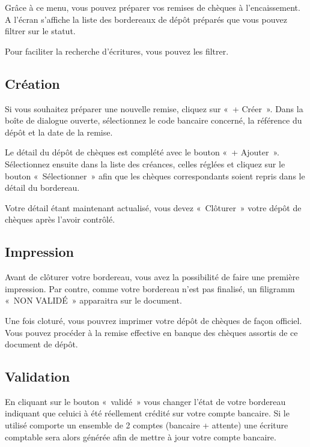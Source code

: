 \documentclass[a4paper,10pt,oneside,french]{sphinxmanual}
\begin{document}
\sphinxAtStartPar
Grâce à ce menu, vous pouvez préparer vos remises de chèques à l’encaissement.
A l’écran s’affiche la liste des bordereaux de dépôt préparés que vous pouvez filtrer sur le statut.
\begin{quote}

\noindent{}
\end{quote}

\sphinxAtStartPar
Pour faciliter la recherche d’écritures, vous pouvez les filtrer.


\subsection{Création}
\label{\detokenize{payoff/deposit:creation}}
\sphinxAtStartPar
Si vous souhaitez préparer une nouvelle remise, cliquez sur « + Créer ».
Dans la boîte de dialogue ouverte, sélectionnez le code bancaire concerné, la référence du dépôt et la date de la remise.

\sphinxAtStartPar
Le détail du dépôt de chèques est complété avec le bouton « + Ajouter ».
Sélectionnez ensuite dans la liste des créances, celles réglées et cliquez sur le bouton « Sélectionner » afin que les chèques correspondants soient repris dans le détail du bordereau.
\begin{quote}

\noindent{}
\end{quote}

\sphinxAtStartPar
Votre détail étant maintenant actualisé, vous devez « Clôturer » votre dépôt de chèques après l’avoir contrôlé.


\subsection{Impression}
\label{\detokenize{payoff/deposit:impression}}
\sphinxAtStartPar
Avant de clôturer votre bordereau, vous avez la possibilité de faire une première impression.
Par contre, comme votre bordereau n’est pas finalisé, un filigramm « NON VALIDÉ » apparaitra sur le document.

\sphinxAtStartPar
Une fois cloturé, vous pouvrez imprimer votre dépôt de chèques de façon officiel.
Vous pouvez procéder à la remise effective en banque des chèques assortis de ce document de dépôt.


\subsection{Validation}
\label{\detokenize{payoff/deposit:validation}}
\sphinxAtStartPar
En cliquant sur le bouton « validé » vous changer l’état de votre bordereau indiquant que celui\sphinxhyphen{}ci à été réellement crédité sur votre compte bancaire.
Si le  utilisé comporte un ensemble de 2 comptes (bancaire + attente) une écriture comptable sera alors générée afin de mettre à jour votre compte bancaire.
\end{document}
